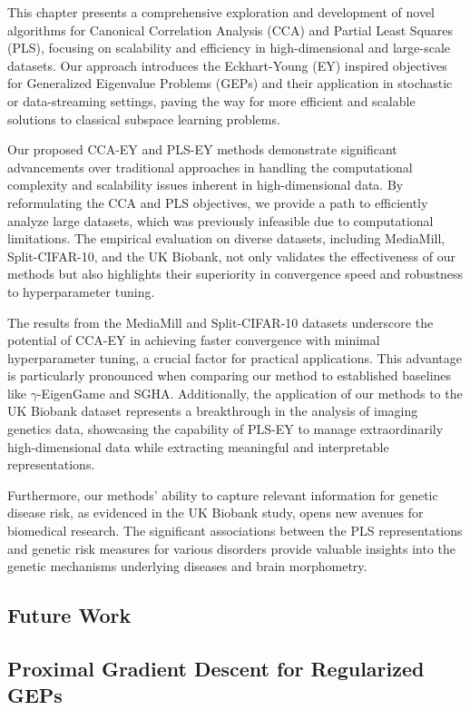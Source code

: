 This chapter presents a comprehensive exploration and development of novel algorithms for Canonical Correlation Analysis (CCA) and Partial Least Squares (PLS), focusing on scalability and efficiency in high-dimensional and large-scale datasets.
Our approach introduces the Eckhart-Young (EY) inspired objectives for Generalized Eigenvalue Problems (GEPs) and their application in stochastic or data-streaming settings, paving the way for more efficient and scalable solutions to classical subspace learning problems.

Our proposed CCA-EY and PLS-EY methods demonstrate significant advancements over traditional approaches in handling the computational complexity and scalability issues inherent in high-dimensional data.
By reformulating the CCA and PLS objectives, we provide a path to efficiently analyze large datasets, which was previously infeasible due to computational limitations.
The empirical evaluation on diverse datasets, including MediaMill, Split-CIFAR-10, and the UK Biobank, not only validates the effectiveness of our methods but also highlights their superiority in convergence speed and robustness to hyperparameter tuning.

The results from the MediaMill and Split-CIFAR-10 datasets underscore the potential of CCA-EY in achieving faster convergence with minimal hyperparameter tuning, a crucial factor for practical applications.
This advantage is particularly pronounced when comparing our method to established baselines like $\gamma$-EigenGame and SGHA. Additionally, the application of our methods to the UK Biobank dataset represents a breakthrough in the analysis of imaging genetics data, showcasing the capability of PLS-EY to manage extraordinarily high-dimensional data while extracting meaningful and interpretable representations.

Furthermore, our methods' ability to capture relevant information for genetic disease risk, as evidenced in the UK Biobank study, opens new avenues for biomedical research.
The significant associations between the PLS representations and genetic risk measures for various disorders provide valuable insights into the genetic mechanisms underlying diseases and brain morphometry.

\subsection{Future Work}

\subsection{Proximal Gradient Descent for Regularized GEPs}

